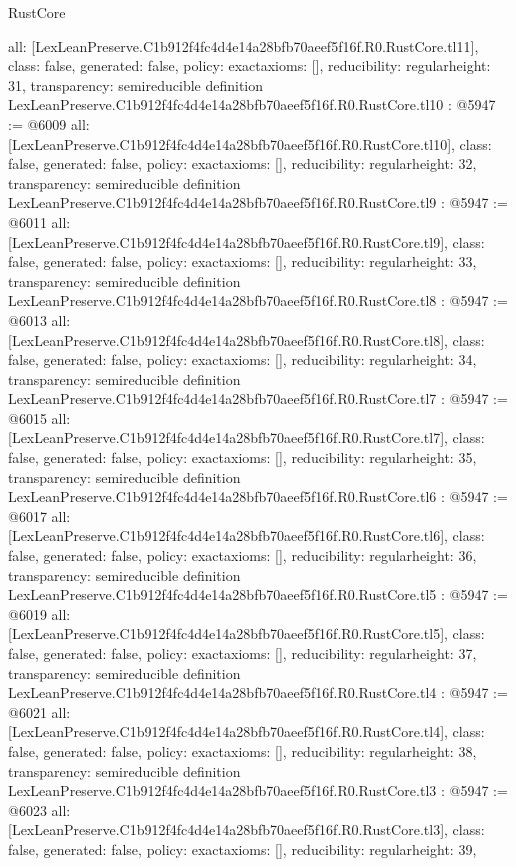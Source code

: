 \begin{lexlean}{RustCore}
\begin{coremodule}
{  all: [LexLeanPreserve.C1b912f4fc4d4e14a28bfb70aeef5f16f.R0.RustCore.tl11],
  class: false,
  generated: false,
  policy: exact{axioms: []},
  reducibility: regular{height: 31},
  transparency: semireducible
}
definition LexLeanPreserve.C1b912f4fc4d4e14a28bfb70aeef5f16f.R0.RustCore.tl10 : @5947 := @6009 {
  all: [LexLeanPreserve.C1b912f4fc4d4e14a28bfb70aeef5f16f.R0.RustCore.tl10],
  class: false,
  generated: false,
  policy: exact{axioms: []},
  reducibility: regular{height: 32},
  transparency: semireducible
}
definition LexLeanPreserve.C1b912f4fc4d4e14a28bfb70aeef5f16f.R0.RustCore.tl9 : @5947 := @6011 {
  all: [LexLeanPreserve.C1b912f4fc4d4e14a28bfb70aeef5f16f.R0.RustCore.tl9],
  class: false,
  generated: false,
  policy: exact{axioms: []},
  reducibility: regular{height: 33},
  transparency: semireducible
}
definition LexLeanPreserve.C1b912f4fc4d4e14a28bfb70aeef5f16f.R0.RustCore.tl8 : @5947 := @6013 {
  all: [LexLeanPreserve.C1b912f4fc4d4e14a28bfb70aeef5f16f.R0.RustCore.tl8],
  class: false,
  generated: false,
  policy: exact{axioms: []},
  reducibility: regular{height: 34},
  transparency: semireducible
}
definition LexLeanPreserve.C1b912f4fc4d4e14a28bfb70aeef5f16f.R0.RustCore.tl7 : @5947 := @6015 {
  all: [LexLeanPreserve.C1b912f4fc4d4e14a28bfb70aeef5f16f.R0.RustCore.tl7],
  class: false,
  generated: false,
  policy: exact{axioms: []},
  reducibility: regular{height: 35},
  transparency: semireducible
}
definition LexLeanPreserve.C1b912f4fc4d4e14a28bfb70aeef5f16f.R0.RustCore.tl6 : @5947 := @6017 {
  all: [LexLeanPreserve.C1b912f4fc4d4e14a28bfb70aeef5f16f.R0.RustCore.tl6],
  class: false,
  generated: false,
  policy: exact{axioms: []},
  reducibility: regular{height: 36},
  transparency: semireducible
}
definition LexLeanPreserve.C1b912f4fc4d4e14a28bfb70aeef5f16f.R0.RustCore.tl5 : @5947 := @6019 {
  all: [LexLeanPreserve.C1b912f4fc4d4e14a28bfb70aeef5f16f.R0.RustCore.tl5],
  class: false,
  generated: false,
  policy: exact{axioms: []},
  reducibility: regular{height: 37},
  transparency: semireducible
}
definition LexLeanPreserve.C1b912f4fc4d4e14a28bfb70aeef5f16f.R0.RustCore.tl4 : @5947 := @6021 {
  all: [LexLeanPreserve.C1b912f4fc4d4e14a28bfb70aeef5f16f.R0.RustCore.tl4],
  class: false,
  generated: false,
  policy: exact{axioms: []},
  reducibility: regular{height: 38},
  transparency: semireducible
}
definition LexLeanPreserve.C1b912f4fc4d4e14a28bfb70aeef5f16f.R0.RustCore.tl3 : @5947 := @6023 {
  all: [LexLeanPreserve.C1b912f4fc4d4e14a28bfb70aeef5f16f.R0.RustCore.tl3],
  class: false,
  generated: false,
  policy: exact{axioms: []},
  reducibility: regular{height: 39},
}
\end{coremodule}
\end{lexlean}

